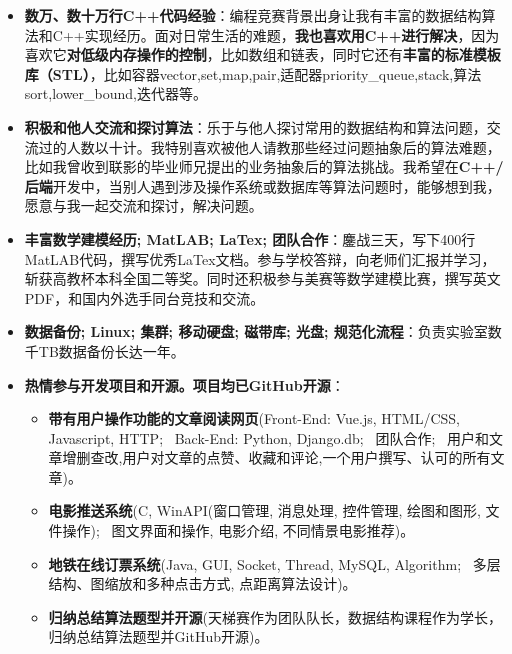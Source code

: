 \documentclass{resume}
\begin{document}
\begin{itemize}
	\item \textbf{数万、数十万行C++代码经验}：编程竞赛背景出身让我有丰富的数据结构算法和C++实现经历。面对日常生活的难题，\textbf{我也喜欢用C++进行解决}，因为喜欢它\textbf{对低级内存操作的控制}，比如数组和链表，同时它还有\textbf{丰富的标准模板库（STL）}，比如容器vector,set,map,pair,适配器priority\_queue,stack,算法sort,lower\_bound,迭代器等。
	\item \textbf{积极和他人交流和探讨算法}：乐于与他人探讨常用的数据结构和算法问题，交流过的人数以十计。我特别喜欢被他人请教那些经过问题抽象后的算法难题，比如我曾收到联影的毕业师兄提出的业务抽象后的算法挑战。我希望在\textbf{C++/后端}开发中，当别人遇到涉及操作系统或数据库等算法问题时，能够想到我，愿意与我一起交流和探讨，解决问题。
	\item \textbf{丰富数学建模经历; MatLAB; LaTex; 团队合作}：鏖战三天，写下400行MatLAB代码，撰写优秀LaTex文档。参与学校答辩，向老师们汇报并学习，斩获高教杯本科全国二等奖。同时还积极参与美赛等数学建模比赛，撰写英文PDF，和国内外选手同台竞技和交流。
	\item \textbf{数据备份; Linux; 集群; 移动硬盘; 磁带库; 光盘; 规范化流程}：负责实验室数千TB数据备份长达一年。
	\item \textbf{热情参与开发项目和开源。项目均已GitHub开源}：
		\begin{itemize}
			\item \textbf{带有用户操作功能的文章阅读网页}(Front-End: Vue.js, HTML/CSS, Javascript, HTTP; \, Back-End: Python, Django.db; \, 团队合作; \, 用户和文章增删查改,用户对文章的点赞、收藏和评论,一个用户撰写、认可的所有文章)。
			\item \textbf{电影推送系统}(C, WinAPI(窗口管理, 消息处理, 控件管理, 绘图和图形, 文件操作); \, 图文界面和操作, 电影介绍, 不同情景电影推荐)。
			\item \textbf{地铁在线订票系统}(Java, GUI, Socket, Thread, MySQL, Algorithm; \, 多层结构、图缩放和多种点击方式, 点距离算法设计)。
			\item \textbf{归纳总结算法题型并开源}(天梯赛作为团队队长，数据结构课程作为学长，归纳总结算法题型并GitHub开源)。
		\end{itemize}
\end{itemize}
\end{document}

